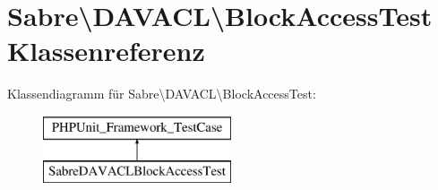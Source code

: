 \hypertarget{class_sabre_1_1_d_a_v_a_c_l_1_1_block_access_test}{}\section{Sabre\textbackslash{}D\+A\+V\+A\+CL\textbackslash{}Block\+Access\+Test Klassenreferenz}
\label{class_sabre_1_1_d_a_v_a_c_l_1_1_block_access_test}
Klassendiagramm für Sabre\textbackslash{}D\+A\+V\+A\+CL\textbackslash{}Block\+Access\+Test\+:\begin{figure}[H]
\begin{center}
\leavevmode
\includegraphics[height=2.000000cm]{class_sabre_1_1_d_a_v_a_c_l_1_1_block_access_test}
\end{center}
\end{figure}
